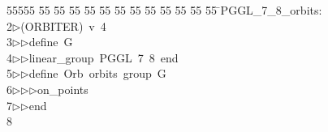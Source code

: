 %
%
\begin{tabbing}
55555 \= 55 \= 55 \= 55 \= 55 \= 55 \= 55 \= 55 \= 55 \= 55 \= 55 \= 55 \= 55 \= \>PGGL\_7\_8\_orbits:\\[0pt]
2\>$\triangleright$\>(ORBITER)\ v\ 4\ \\[0pt]
3\>$\triangleright$\>$\triangleright$\>define\ G\ \\[0pt]
4\>$\triangleright$\>$\triangleright$\>linear\_group\ PGGL\ 7\ 8\ end\ \\[0pt]
5\>$\triangleright$\>$\triangleright$\>define\ Orb\ orbits\ group\ G\ \\[0pt]
6\>$\triangleright$\>$\triangleright$\>$\triangleright$\>on\_points\ \\[0pt]
7\>$\triangleright$\>$\triangleright$\>end\\[0pt]
8\>\end{tabbing}
